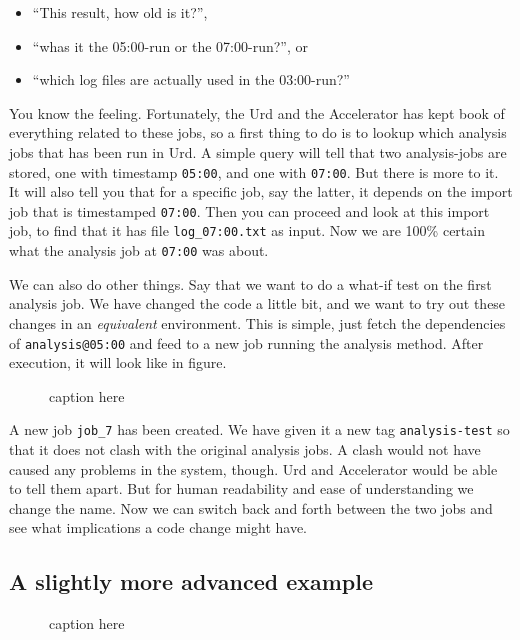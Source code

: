 \documentclass[a4paper]{article}
\begin{document}
\begin{itemize}
\item[]``This result, how old is it?'',
\item[] ``whas it the 05:00-run or the 07:00-run?'', or
\item[] ``which log files are actually used in the 03:00-run?''
\end{itemize}

You know the feeling.  Fortunately, the Urd and the Accelerator has
kept book of everything related to these jobs, so a first thing to do
is to lookup which analysis jobs that has been run in Urd.  A simple
query will tell that two analysis-jobs are stored, one with timestamp
\texttt{05:00}, and one with \texttt{07:00}.  But there is more to it.
It will also tell you that for a specific job, say the latter, it
depends on the import job that is timestamped \texttt{07:00}.  Then
you can proceed and look at this import job, to find that it has file
\texttt{log\_07:00.txt} as input.  Now we are 100\% certain what the
analysis job at \texttt{07:00} was about.

We can also do other things.  Say that we want to do a what-if test on
the first analysis job.  We have changed the code a little bit, and we
want to try out these changes in an \textsl{equivalent} environment.
This is simple, just fetch the dependencies of \texttt{analysis@05:00}
and feed to a new job running the analysis method.  After execution,
it will look like in figure.
\begin{figure}[h!]
  \begin{center}
    
    \caption{caption here}
    \label{figure:example}
  \end{center}
\end{figure}
A new job \texttt{job\_7} has been created.  We have given it a new
tag \texttt{analysis-test} so that it does not clash with the original
analysis jobs.  A clash would not have caused any problems in the
system, though.  Urd and Accelerator would be able to tell them apart.
But for human readability and ease of understanding we change the
name.  Now we can switch back and forth between the two jobs and see
what implications a code change might have.


\subsection{A slightly more advanced example}
\begin{figure}[h!]
  \begin{center}
    
    \caption{caption here}
    \label{figure:example}
  \end{center}
\end{figure}
\end{document}
